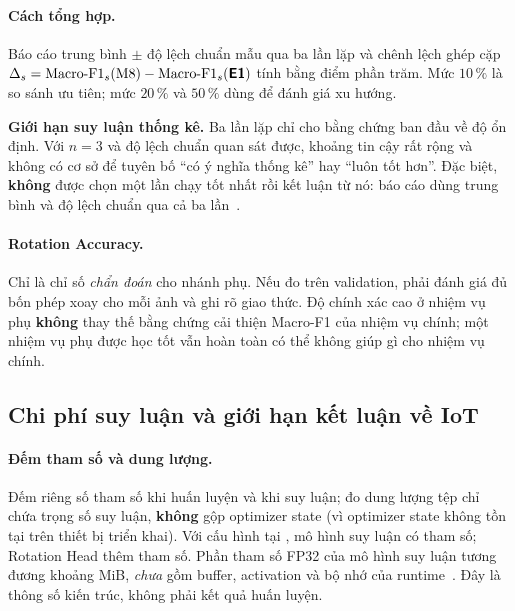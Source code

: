 \paragraph{Cách tổng hợp.} Báo cáo trung bình $\pm$ độ lệch chuẩn mẫu qua ba lần lặp và chênh
lệch ghép cặp $\Delta_s = \mathrm{Macro\text{-}F1}_s(\text{M8}) -
\mathrm{Macro\text{-}F1}_s(\textsf{\textbf{E1}})$ tính bằng điểm phần trăm. Mức $10\,\%$ là so sánh ưu
tiên; mức $20\,\%$ và $50\,\%$ dùng để đánh giá xu hướng.

\begin{warnbox}
\textbf{Giới hạn suy luận thống kê.} Ba lần lặp chỉ cho bằng chứng ban đầu về độ ổn định.
Với $n=3$ và độ lệch chuẩn quan sát được, khoảng tin cậy rất rộng và không có cơ sở để tuyên
bố \enquote{có ý nghĩa thống kê} hay \enquote{luôn tốt hơn}. Đặc biệt, \textbf{không} được chọn
một lần chạy tốt nhất rồi kết luận từ nó: báo cáo dùng trung bình và độ lệch chuẩn qua cả ba
lần~\cite{bouthillier2021variance}.
\end{warnbox}

\paragraph{Rotation Accuracy.} Chỉ là chỉ số \emph{chẩn đoán} cho nhánh phụ. Nếu đo trên
validation, phải đánh giá đủ bốn phép xoay cho mỗi ảnh và ghi rõ giao thức. Độ chính xác cao ở
nhiệm vụ phụ \textbf{không} thay thế bằng chứng cải thiện Macro-F1 của nhiệm vụ chính; một
nhiệm vụ phụ được học tốt vẫn hoàn toàn có thể không giúp gì cho nhiệm vụ chính.

\subsection{Chi phí suy luận và giới hạn kết luận về IoT}
\label{sec:cost-protocol}

\paragraph{Đếm tham số và dung lượng.} Đếm riêng số tham số khi huấn luyện và khi suy luận; đo
dung lượng tệp chỉ chứa trọng số suy luận, \textbf{không} gộp optimizer state (vì optimizer
state không tồn tại trên thiết bị triển khai). Với cấu hình tại , mô hình suy
luận có \RParamInference{} tham số; Rotation Head thêm \RParamRotationHead{} tham số. Phần tham
số FP32 của mô hình suy luận tương đương khoảng \RParamInferenceMiB{} MiB, \emph{chưa} gồm
buffer, activation và bộ nhớ của runtime~\cite{pytorch_resnet}. Đây là thông số kiến trúc, không
phải kết quả huấn luyện.

